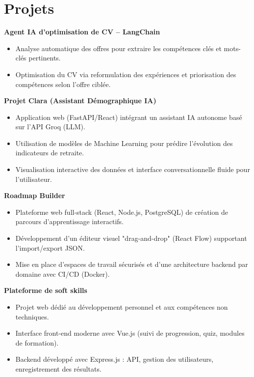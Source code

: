 \documentclass[a4paper,11pt]{article}
\begin{document}
\section*{Projets}

\textbf{Agent IA d'optimisation de CV – LangChain}
\begin{itemize}[leftmargin=*, noitemsep]
    \item Analyse automatique des offres pour extraire les compétences clés et mots-clés pertinents.
    \item Optimisation du CV via reformulation des expériences et priorisation des compétences selon l'offre ciblée.
\end{itemize}

\textbf{Projet Clara (Assistant Démographique IA)}
\begin{itemize}[leftmargin=*, noitemsep]
    \item Application web (FastAPI/React) intégrant un assistant IA autonome basé sur l'API Groq (LLM).
    \item Utilisation de modèles de Machine Learning pour prédire l'évolution des indicateurs de retraite.
    \item Visualisation interactive des données et interface conversationnelle fluide pour l'utilisateur.
\end{itemize}

\textbf{Roadmap Builder}
\begin{itemize}[leftmargin=*, noitemsep]
    \item Plateforme web full-stack (React, Node.js, PostgreSQL) de création de parcours d'apprentissage interactifs.
    \item Développement d'un éditeur visuel "drag-and-drop" (React Flow) supportant l'import/export JSON.
    \item Mise en place d'espaces de travail sécurisés et d'une architecture backend par domaine avec CI/CD (Docker).
\end{itemize}

\textbf{Plateforme de soft skills}
\begin{itemize}[leftmargin=*, noitemsep]
    \item Projet web dédié au développement personnel et aux compétences non techniques.
    \item Interface front-end moderne avec Vue.js (suivi de progression, quiz, modules de formation).
    \item Backend développé avec Express.js : API, gestion des utilisateurs, enregistrement des résultats.
\end{itemize}
\end{document}
